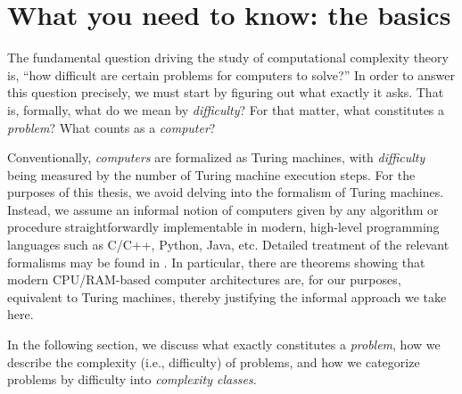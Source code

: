 \chapter{What you need to know: the basics}

The fundamental question driving the study of computational complexity theory
is, ``how difficult are certain problems for computers to solve?''  In order to
answer this question precisely, we must start by figuring out what exactly it
asks.  That is, formally, what do we mean by \emph{difficulty}?  For that
matter, what constitutes a \emph{problem}?  What counts as a \emph{computer}?

Conventionally, \emph{computers} are formalized as Turing machines, with
\emph{difficulty} being measured by the number of Turing machine execution
steps.  For the purposes of this thesis, we avoid delving into the formalism of
Turing machines.  Instead, we assume an informal notion of computers given by
any algorithm or procedure straightforwardly implementable in modern,
high-level programming languages such as C/C++, Python, Java, etc.  Detailed
treatment of the relevant formalisms may be found in \textcite[Chapter
2]{papadimitriou.cc}.  In particular, there are theorems \parencite[Theorem
2.5]{papadimitriou.cc} showing that modern CPU/RAM-based computer architectures
are, for our purposes, equivalent to Turing machines, thereby justifying the
informal approach we take here.

In the following section, we discuss what exactly constitutes a \emph{problem},
how we describe the complexity (i.e., difficulty) of problems, and how we
categorize problems by difficulty into \emph{complexity classes}.





